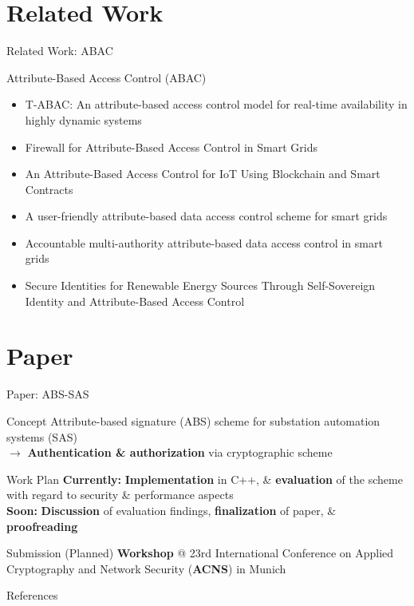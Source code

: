 \documentclass[en]{sdqbeamer}
\begin{document}
\section{Related Work}
\begin{frame}{Related Work: ABAC}
    \begin{blueblock}{Attribute-Based Access Control (ABAC)}
        \begin{itemize}
            \item T-ABAC: An attribute-based access control model for real-time availability in highly dynamic systems \parencite{Burmester2013}
            \item Firewall for Attribute-Based Access Control in Smart Grids \parencite{Ruland2018}
            \item An Attribute-Based Access Control for IoT Using Blockchain and Smart Contracts \parencite{Zaidi2021}
            \item A user-friendly attribute-based data access control scheme for smart grids \parencite{Mu2023}
            \item Accountable multi-authority attribute-based data access control in smart grids \parencite{Zhang2023}
            \item Secure Identities for Renewable Energy Sources Through Self-Sovereign Identity and Attribute-Based Access Control \parencite{Volkmann2024}
        \end{itemize}
    \end{blueblock}
\end{frame}

\section{Paper}
\begin{frame}{Paper: ABS-SAS}
    \begin{greenblock}{Concept}
        Attribute-based signature (ABS) scheme for substation automation systems (SAS)
        \\$\rightarrow$ \textbf{Authentication \& authorization} via cryptographic scheme
    \end{greenblock}
    \begin{blueblock}{Work Plan}
        \textbf{Currently:} \textbf{Implementation} in C++, \& \textbf{evaluation} of the scheme with regard to security \& performance aspects\\
        \textbf{Soon:} \textbf{Discussion} of evaluation findings, \textbf{finalization} of paper, \& \textbf{proofreading}
    \end{blueblock}
    \begin{grayblock}{Submission (Planned)}
        \textbf{Workshop} @ 23rd International Conference on Applied Cryptography and Network Security (\textbf{ACNS}) in Munich
    \end{grayblock}
\end{frame}

\begin{frame}[allowframebreaks]{References}
\printbibliography
\end{frame}

\backupend
\end{document}
